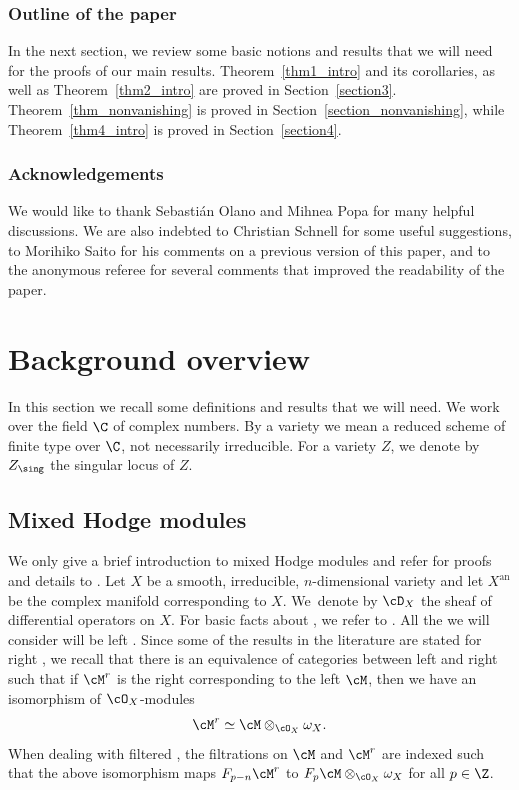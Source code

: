 \subsubsection*{Outline of the paper}
In the next section, we review some basic notions and results that we will need for the proofs of our main results.
Theorem~\ref{thm1_intro} and its corollaries, as well as Theorem~\ref{thm2_intro} are proved in Section~\ref{section3}. Theorem~\ref{thm_nonvanishing}
is proved in Section~\ref{section_nonvanishing},
while Theorem~\ref{thm4_intro} is proved in Section~\ref{section4}.

\subsubsection*{Acknowledgements}
We would like to thank Sebastián Olano and Mihnea Popa for many helpful discussions.
We are also indebted to Christian Schnell for some useful suggestions, to Morihiko Saito for his comments on a previous version of this paper, and to the anonymous referee
for several comments that improved the readability of the paper.

\section{Background overview}\label{section2}

In this section we recall some definitions and results that we will need.
We work over the field $\C$ of complex numbers. By a variety we mean a reduced scheme of finite type over $\C$, not necessarily irreducible.
For a variety $Z$, we denote by $Z_\sing$ the singular locus of $Z$.

\subsection{Mixed Hodge modules}\label{section_MHM} We only give a brief introduction to mixed Hodge modules and refer for proofs and details to \cite{Saito_MHM}.
Let $X$ be a smooth, irreducible, $n$-dimensional variety and let $X^\mathrm{an}$ be the complex manifold corresponding to $X$. We~\hbox{denote} by $\cD_X$ the sheaf of differential operators on $X$. For basic facts about \DXmodules,
we refer to \cite{HTT}. All the \DXmodules we will consider will be left \DXmodules. Since some of the results in the literature are stated for
right \DXmodules, we recall that there is an equivalence of categories between left and right \DXmodules such that if $\cM^r$ is the right
\DXmodule corresponding to the left \DXmodule $\cM$, then we have an isomorphism of $\cO_X$-modules
\[\cM^r\simeq\cM\otimes_{\cO_X}\omega_X.\]
When dealing with filtered \DXmodules, the filtrations on $\cM$ and $\cM^r$ are indexed such that
the above isomorphism maps $F_{p-n}\cM^r$ to $F_p\cM\otimes_{\cO_X}\omega_X$ for all $p\in\Z$.

